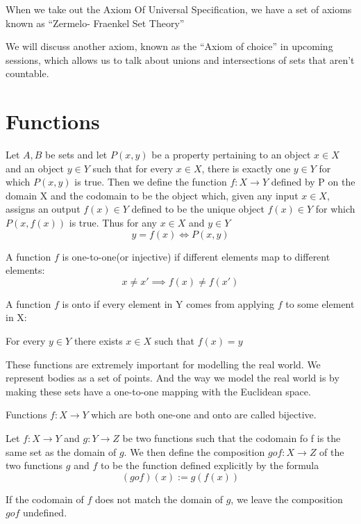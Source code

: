\documentclass[11pt]{report}
\begin{document}
When we take out the Axiom Of Universal Specification, we have a set of axioms known as ``Zermelo- Fraenkel Set Theory''

We will discuss another axiom, known as the ``Axiom of choice'' in upcoming sessions, which allows us to talk about unions and intersections of sets that aren't countable.
\section{Functions}

\begin{definition}[Functions]
	Let $A,B$ be sets and let $P(x,y)$ be a property pertaining to an object $x \in X$ and an object $y \in Y$ such that for every $x \in X$, there is exactly one $y \in Y$ for which $P(x,y)$ is true. Then we define the function $f:X  \rightarrow Y$ defined by P on the domain X and the codomain to be the object which, given any input $x \in X$, assigns an output $f(x) \in Y$ defined to be the unique object $f(x) \in Y$ for which $P(x, f(x))$ is true. Thus for any $x \in X$ and $y \in Y$
	\[
		y = f(x) \Leftrightarrow P(x,y)
	\]
\end{definition}

\begin{definition}
	A function $f$ is one-to-one(or injective) if different elements map to different elements:
	\[
		x \ne x' \implies f(x) \ne f(x')
	\]
\end{definition}
\begin{definition}
	A function $f$ is onto if every element in Y comes from applying $f$ to some element in X:

	For every $y \in Y$ there exists $x \in X$ such that $f(x) = y$
\end{definition}
These functions are extremely important for modelling the real world. We represent bodies as a set of points. And the way we model the real world is by making these sets have a one-to-one mapping with the Euclidean space.
\begin{definition}
	Functions $f: X \rightarrow Y$ which are both one-one and onto are called bijective.
\end{definition}

\begin{definition}
	Let $f: X \rightarrow Y$ and $g: Y \rightarrow Z$ be two functions such that the codomain fo f is the same set as the domain of $g$. We then define the composition $g o f: X \rightarrow Z$ of the two functions $g$ and $f$ to be the function defined explicitly by the formula
	\[
		(g o f)(x) := g(f(x))
	\]

	If the codomain of $f$ does not match the domain of $g$, we leave the composition $g o f$ undefined.
\end{definition}
\end{document}

